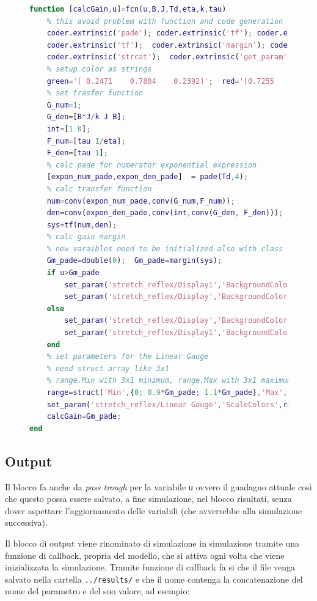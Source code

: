 \begin{figure}[h!]
\begin{lstlisting}[language=matlab,style=mystyle]
function [calcGain,u]=fcn(u,B,J,Td,eta,k,tau)
	% this avoid problem with function and code generation
	coder.extrinsic('pade'); coder.extrinsic('tf'); coder.extrinsic('rlocus')
	coder.extrinsic('tf'); 	coder.extrinsic('margin'); coder.extrinsic('type')
	coder.extrinsic('strcat'); 	coder.extrinsic('get_param'); 	coder.extrinsic('set_param')
	% setup color as strings
	green='[ 0.2471    0.7804    0.2392]'; 	red='[0.7255    0.2941    0.2100]';	
	% set trasfer function
	G_num=1;
	G_den=[B*J/k J B];
	int=[1 0];
	F_num=[tau 1/eta];
	F_den=[tau 1];
	% calc pade for numerator exponential expression
	[expon_num_pade,expon_den_pade]  = pade(Td,4);
	% calc transfer function
	num=conv(expon_num_pade,conv(G_num,F_num));
	den=conv(expon_den_pade,conv(int,conv(G_den, F_den)));
	sys=tf(num,den);
	% calc gain margin
	% new varaibles need to be initialized also with class type
	Gm_pade=double(0); 	Gm_pade=margin(sys);
	if u>Gm_pade
		set_param('stretch_reflex/Display1','BackgroundColor',red);
		set_param('stretch_reflex/Display','BackgroundColor',red);
	else
		set_param('stretch_reflex/Display','BackgroundColor',green);
		set_param('stretch_reflex/Display1','BackgroundColor',green);
	end
	% set parameters for the Linear Gauge
	% need struct array like 3x1
	% range.Min with 3x1 minimum, range.Max with 3x1 maximum,  range.Color with [r g b] color
	range=struct('Min',{0; 0.9*Gm_pade; 1.1*Gm_pade},'Max',{0.9*Gm_pade; 1.1*Gm_pade; 250},'Color',{[0.2471  0.7804 0.2392];[0.9294 0.6941 0.1255]; [0.7255 0.2941 0.2000]});
	set_param('stretch_reflex/Linear Gauge','ScaleColors',range)
	calcGain=Gm_pade;
end
\end{lstlisting}
\end{figure}

\subsection{Output}

Il blocco fa anche da \textit{pass trough} per la variabile \texttt{u} ovvero il guadagno attuale così che questo possa essere salvato, a fine simulazione, nel blocco risultati, senza dover aspettare l'aggiornamento delle variabili (che avverrebbe alla simulazione successiva).

Il blocco di output viene rinominato di simulazione in simulazione tramite una funzione di callback, propria del modello, che si attiva ogni volta che viene inizializzata la simulazione. Tramite funzione di callback fa si che il file venga salvato nella cartella \texttt{../results/} e che il nome contenga la concatenazione del nome del parametro e del suo valore, ad esempio:

